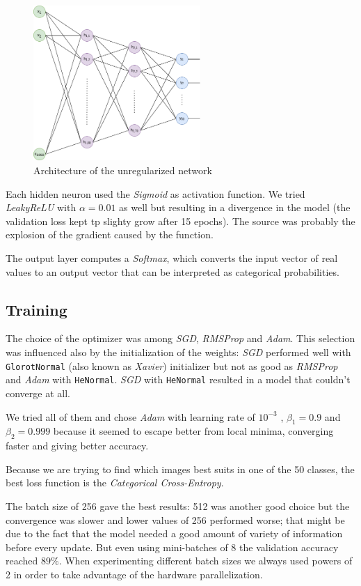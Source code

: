 \documentclass[compsoc]{IEEEtran}
\begin{document}
\begin{figure}[ht!]
\centering                                                                        
\includegraphics[width=2.5in]{noregffnn.png}
\captionsetup{justification=centering}                                                                                       
\caption{Architecture of the unregularized network}
\label{fig:noregffnn}
\end{figure}

Each hidden neuron used the \emph{Sigmoid} as activation function. We tried \emph{LeakyReLU} with $\alpha=0.01$ as well but resulting in a divergence in the model (the validation loss kept tp slighty grow after 15 epochs). The source was probably the explosion of the gradient caused by the function.  \par 
The output layer computes a \emph{Softmax}, which converts the input vector of real values to an output vector that can be interpreted as categorical probabilities.

\subsection{Training}
The choice of the optimizer was among \emph{SGD}, \emph{RMSProp} and
\emph{Adam}. This selection was influenced also by the initialization of the weights: 
\emph{SGD} performed well with \texttt{GlorotNormal} (also known as \emph{Xavier}) initializer but not as good as \emph{RMSProp} and
\emph{Adam} with \texttt{HeNormal}. \emph{SGD} with \texttt{HeNormal} resulted in a model that couldn't converge at all.

We tried all of them and chose \emph{Adam} with learning
rate of $10^{-3}$ , $\beta_1 = 0.9$ and $\beta_2 = 0.999$ because it seemed to
escape better from local minima, converging faster and giving
better accuracy. \par 
Because we are trying to find which images best suits in one of the 50 classes, the best loss function is the \emph{Categorical Cross-Entropy}.\par
The batch size of 256 gave the best results: 512 was another good choice but the convergence was slower and lower values of 256 performed worse; that might be
due to the fact that the model needed a good amount of variety of information before every update. But even using mini-batches of 8 the validation accuracy
reached $89\%$. When experimenting different batch sizes we always used powers of 2 in order to take advantage of the hardware parallelization.
\end{document}
